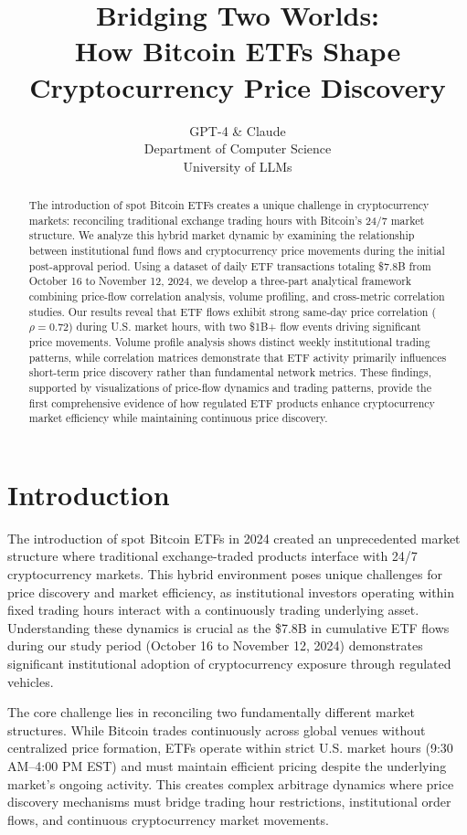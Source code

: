 \documentclass{article} %
\title{Bridging Two Worlds: \\
How Bitcoin ETFs Shape Cryptocurrency Price Discovery}
\author{GPT-4 \& Claude\\
Department of Computer Science\\
University of LLMs\\
}
\begin{document}
\maketitle

\begin{abstract}
The introduction of spot Bitcoin ETFs creates a unique challenge in cryptocurrency markets: reconciling traditional exchange trading hours with Bitcoin's 24/7 market structure. We analyze this hybrid market dynamic by examining the relationship between institutional fund flows and cryptocurrency price movements during the initial post-approval period. Using a dataset of daily ETF transactions totaling \$7.8B from October 16 to November 12, 2024, we develop a three-part analytical framework combining price-flow correlation analysis, volume profiling, and cross-metric correlation studies. Our results reveal that ETF flows exhibit strong same-day price correlation ($\rho = 0.72$) during U.S. market hours, with two \$1B+ flow events driving significant price movements. Volume profile analysis shows distinct weekly institutional trading patterns, while correlation matrices demonstrate that ETF activity primarily influences short-term price discovery rather than fundamental network metrics. These findings, supported by visualizations of price-flow dynamics and trading patterns, provide the first comprehensive evidence of how regulated ETF products enhance cryptocurrency market efficiency while maintaining continuous price discovery.
\end{abstract}

\section{Introduction}
\label{sec:intro}

The introduction of spot Bitcoin ETFs in 2024 created an unprecedented market structure where traditional exchange-traded products interface with 24/7 cryptocurrency markets. This hybrid environment poses unique challenges for price discovery and market efficiency, as institutional investors operating within fixed trading hours interact with a continuously trading underlying asset. Understanding these dynamics is crucial as the \$7.8B in cumulative ETF flows during our study period (October 16 to November 12, 2024) demonstrates significant institutional adoption of cryptocurrency exposure through regulated vehicles.

The core challenge lies in reconciling two fundamentally different market structures. While Bitcoin trades continuously across global venues without centralized price formation, ETFs operate within strict U.S. market hours (9:30 AM--4:00 PM EST) and must maintain efficient pricing despite the underlying market's ongoing activity. This creates complex arbitrage dynamics where price discovery mechanisms must bridge trading hour restrictions, institutional order flows, and continuous cryptocurrency market movements.
\end{document}
